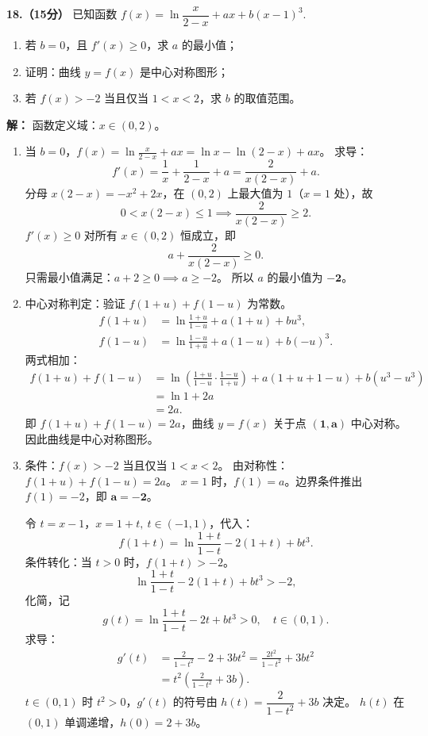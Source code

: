 \documentclass{article}
\begin{document}
\noindent\textbf{18.（15分）} 已知函数 $f(x)=\ln \dfrac{x}{2-x}+ax+b(x-1)^3$.
\begin{enumerate}[label=(\arabic*)]
    \item 若 $b=0$，且 $f'(x)\ge 0$，求 $a$ 的最小值；
    \item 证明：曲线 $y=f(x)$ 是中心对称图形；
    \item 若 $f(x)>-2$ 当且仅当 $1<x<2$，求 $b$ 的取值范围。
\end{enumerate}

\vspace{0.5cm}
\noindent\textbf{解：}
函数定义域：$x\in(0,2)$。

\begin{enumerate}[label=(\arabic*)]
\item 当 $b=0$，$f(x)=\ln\frac{x}{2-x}+ax=\ln x-\ln(2-x)+ax$。
求导：
\[
f'(x)=\frac1x+\frac{1}{2-x}+a
=\frac{2}{x(2-x)}+a.
\]
分母 $x(2-x)=-x^2+2x$，在 $(0,2)$ 上最大值为 $1$（$x=1$ 处），故
\[
0<x(2-x)\le 1 \implies \frac{2}{x(2-x)}\ge 2.
\]
$f'(x)\ge 0$ 对所有 $x\in(0,2)$ 恒成立，即
\[
a+\frac{2}{x(2-x)}\ge 0.
\]
只需最小值满足：$a+2\ge 0 \implies a\ge -2$。
所以 $a$ 的最小值为 $\boldsymbol{-2}$。

\item 中心对称判定：验证 $f(1+u)+f(1-u)$ 为常数。
\[
\begin{aligned}
f(1+u)&=\ln\frac{1+u}{1-u}+a(1+u)+b u^3,\\
f(1-u)&=\ln\frac{1-u}{1+u}+a(1-u)+b (-u)^3.
\end{aligned}
\]
两式相加：
\[
\begin{aligned}
f(1+u)+f(1-u)
&=\ln\left(\frac{1+u}{1-u}\cdot\frac{1-u}{1+u}\right)+a(1+u+1-u)+b\left(u^3-u^3\right)\\
&=\ln 1 + 2a \\
&=2a.
\end{aligned}
\]
即 $f(1+u)+f(1-u)=2a$，曲线 $y=f(x)$ 关于点 $\boldsymbol{(1,a)}$ 中心对称。
因此曲线是中心对称图形。

\item 条件：$f(x)>-2$ 当且仅当 $1<x<2$。
由对称性：$f(1+u)+f(1-u)=2a$。
$x=1$ 时，$f(1)=a$。边界条件推出 $f(1)=-2$，即 $\boldsymbol{a=-2}$。

令 $t=x-1$，$x=1+t,\ t\in(-1,1)$，代入：
\[
f(1+t)=\ln\frac{1+t}{1-t}-2(1+t)+bt^3.
\]
条件转化：当 $t>0$ 时，$f(1+t)>-2$。
\[
\ln\frac{1+t}{1-t}-2(1+t)+bt^3 > -2,
\]
化简，记
\[
g(t)=\ln\frac{1+t}{1-t}-2t+bt^3>0,\quad t\in(0,1).
\]
求导：
\[
\begin{aligned}
g'(t)&=\frac{2}{1-t^2}-2+3bt^2
=\frac{2t^2}{1-t^2}+3bt^2 \\
&=t^2\left( \frac{2}{1-t^2}+3b \right).
\end{aligned}
\]
$t\in(0,1)$ 时 $t^2>0$，$g'(t)$ 的符号由 $h(t)=\dfrac{2}{1-t^2}+3b$ 决定。
$h(t)$ 在 $(0,1)$ 单调递增，$h(0)=2+3b$。


\end{enumerate}
\end{document}
